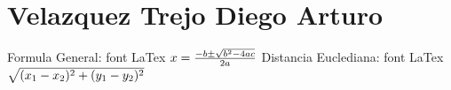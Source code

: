 \chapter{Velazquez Trejo Diego Arturo}
\usepackage{amsmath}


Formula General: {\fontsize{80}{0}\select font LaTex}
$ \\ x = \frac{-b\pm\sqrt{b^{2}-4ac}}{2a} \\$
Distancia Euclediana: {\fontsize{80}{0}\select font LaTex}
$ \\ \sqrt{(x_1 - x_2)^2 + (y_1 - y_2)^2} \\$


